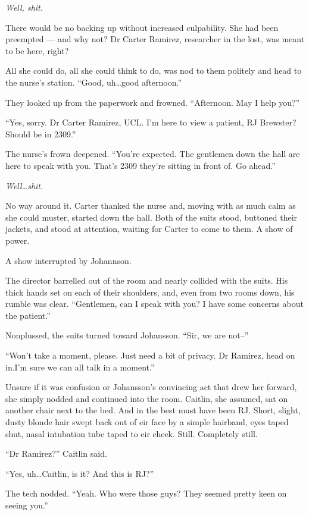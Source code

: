 \emph{Well, shit.}

There would be no backing up without increased culpability. She had been preempted — and why not? Dr Carter Ramirez, researcher in the lost, was meant to be here, right?

All she could do, all she could think to do, was nod to them politely and head to the nurse's station. ``Good, uh\ldots{}good afternoon.''

They looked up from the paperwork and frowned. ``Afternoon. May I help you?''

``Yes, sorry. Dr Carter Ramirez, UCL. I'm here to view a patient, RJ Brewster? Should be in 2309.''

The nurse's frown deepened. ``You're expected. The gentlemen down the hall are here to speak with you. That's 2309 they're sitting in front of. Go ahead.''

\emph{Well\ldots{}shit.}

No way around it. Carter thanked the nurse and, moving with as much calm as she could muster, started down the hall. Both of the suits stood, buttoned their jackets, and stood at attention, waiting for Carter to come to them. A show of power.

A show interrupted by Johannson.

The director barrelled out of the room and nearly collided with the suits. His thick hands set on each of their shoulders, and, even from two rooms down, his rumble was clear. ``Gentlemen, can I speak with you? I have some concerns about the patient.''

Nonplussed, the suits turned toward Johansson. ``Sir, we are not--''

``Won't take a moment, please. Just need a bit of privacy. Dr Ramirez, head on in.I'm sure we can all talk in a moment.''

Unsure if it was confusion or Johansson's convincing act that drew her forward, she simply nodded and continued into the room. Caitlin, she assumed, sat on another chair next to the bed. And in the best must have been RJ. Short, slight, dusty blonde hair swept back out of eir face by a simple hairband, eyes taped shut, nasal intubation tube taped to eir cheek. Still. Completely still.

``Dr Ramirez?'' Caitlin said.

``Yes, uh\ldots{}Caitlin, is it? And this is RJ?''

The tech nodded. ``Yeah. Who were those guys? They seemed pretty keen on seeing you.''

